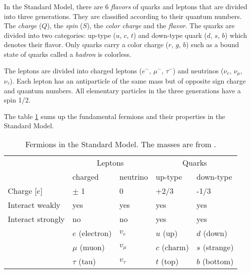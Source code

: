 In the Standard Model, there are 6 \textit{flavors} of quarks and leptons that are divided into three generations. They are classified according to their quantum numbers. The \textit{charge} ($Q$), the \textit{spin} ($S$), the \textit{color charge} and the \textit{flavor}. The quarks are divided into two categories: up-type ($u$, $c$, $t$) and down-type quark ($d$, $s$, $b$) which denotes their flavor. Only quarks carry a color charge ($r$, $g$, $b$) such as a bound state of quarks called a \textit{hadron} is colorless.

The leptons are divided into charged leptons ($e^-$, $\mu^-$, $\tau^-$) and neutrinos ($\nu_e$, $\nu_{\mu}$, $\nu_{\tau}$). Each lepton has an antiparticle of the same mass but of opposite sign charge and quantum numbers. All elementary particles in the three generations have a spin 1/2.

The table \ref{table:Fermions} sums up the fundamental fermions and their properties in the Standard Model.


\begin{table}[htb!]
  \centering
  \caption{Fermions in the Standard Model. The masses are from \cite{Patrignani:2016xqp}.}
  \label{table:Fermions}
  \begin{tabular}{@{}lllll@{}} \toprule
    & \multicolumn{2}{c}{Leptons} & \multicolumn{2}{c}{Quarks} \\ \cmidrule(r){2-5}
    & charged & neutrino & up-type & down-type \\ \midrule
    Charge [$e$] & $\pm$ 1 & 0 & +2/3 & -1/3 \\
    Interact weakly & yes & yes & yes & yes \\
    Interact strongly & no & no & yes & yes \\ \midrule
    & $e$ (electron) & $v_e$ & $u$ (up) & $d$ (down) \\
    & $\mu$ (muon) & $v_{\mu}$ & $c$ (charm) & $s$ (strange) \\
    & $\tau$ (tau) & $v_{\tau}$ & $t$ (top) & $b$ (bottom) \\
    \bottomrule
  \end{tabular}
\end{table}

